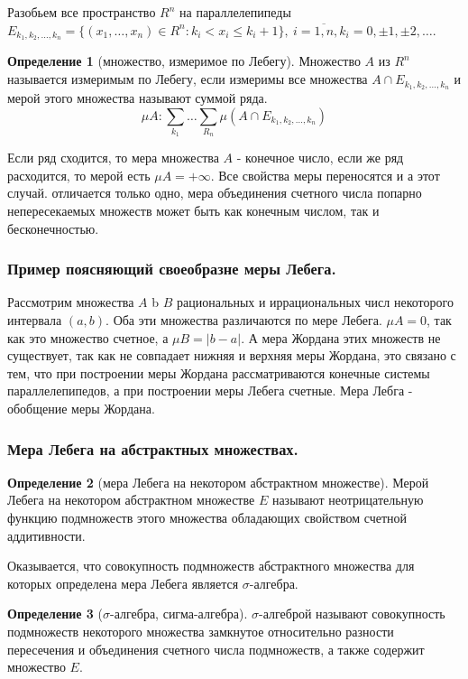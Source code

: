 \documentclass[14pt,a4paper]{extarticle}
\theoremstyle{definition}
\newtheorem{definition}{Определение}[section]
\theoremstyle{remark}
\renewcommand{\[}{\begin{dmath*}[compact]}
\renewcommand{\]}{\end{dmath*}}
\newcommand{\sep}{ , \ \allowbreak }
\begin{document}
Разобьем все пространство $R^n$ на параллелепипеды
$E_{k_1,k_2,\dots,k_n}=\{(x_1,\dots,x_n) \in R^n:k_i<x_i \leq k_i+1 \} \sep
i=\overline{1,n}, k_i=0, \pm 1, \pm 2, \dots$.

\begin{definition}[множество, измеримое по Лебегу]
  Множество $A$ из $R^n$ называется измеримым по Лебегу,
  если измеримы все множества $A \cap E_{k_1,k_2,\dots,k_n}$
  и мерой этого множества называют суммой ряда.
  \[\mu A: \sum_{k_1} \dots \sum_{R_n} \mu (A \cap E_{k_1,k_2,\dots,k_n})\]
\end{definition}

Если ряд сходится, то мера множества $A$ - конечное число,
если же ряд расходится, то мерой есть $\mu A = + \infty$.
Все свойства меры переносятся и а этот случай. отличается только одно,
мера объединения счетного числа попарно непересекаемых множеств может быть
как конечным числом, так и бесконечностью.

\subsubsection{Пример поясняющий своеобразне меры Лебега.}

Рассмотрим множества $A$ b $B$ рациональных и иррациональных числ
некоторого интервала $(a,b)$.
Оба эти множества различаются по мере Лебега.
$\mu A = 0$, так как это множество счетное, а $\mu B = |b-a|$.
А мера Жордана этих множеств не существует, так как не совпадает
нижняя и верхняя меры Жордана, это связано с тем, что при построении
меры Жордана рассматриваются конечные системы параллелепипедов,
а при построении меры Лебега счетные. Мера Лебга - обобщение меры Жордана.

\subsubsection{Мера Лебега на абстрактных множествах.}

\begin{definition}[мера Лебега на некотором абстрактном множестве]
  Мерой Лебега на некотором абстрактном множестве $E$ называют
  неотрицательную функцию подмножеств этого множества обладающих
  свойством счетной аддитивности.
\end{definition}

Оказывается, что совокупность подмножеств абстрактного множества для которых
определена мера Лебега является $\sigma$-алгебра.

\begin{definition}[$\sigma$-алгебра, сигма-алгебра]
  $\sigma$-алгеброй называют совокупность подмножеств некоторого
  множества замкнутое относительно разности пересечения и объединения
  счетного числа подмножеств, а также содержит множество $E$.
\end{definition}
\end{document}
